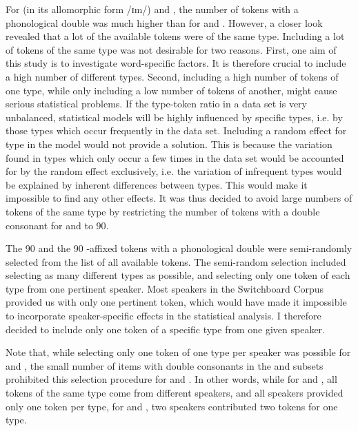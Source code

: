 For  (in its allomorphic form /ɪm/) and , the number of tokens with a phonological double was much higher than for  and . However, a closer look revealed that a lot of the available tokens were of the same type. Including a lot of tokens of the same type was not desirable for two reasons. 
First, one aim of this study is to investigate word-specific factors. It is therefore crucial to include a high number of different types. 
Second, including a high number of tokens of one type, while only including a low number of tokens of another, might cause serious statistical problems. If the type-token ratio in a data set is very unbalanced, statistical models will be highly influenced by specific types, i.e. by those types which occur frequently in the data set. Including a random effect for type in the model would not provide a solution. This is because the variation found in types which only occur a few times in the data set would be accounted for by the random effect exclusively, i.e. the variation of infrequent types would be explained by inherent differences between types. This would make it impossible to find any other effects. 
It was thus decided to avoid large numbers of tokens of the same type by restricting the number of tokens with a double consonant for  and  to 90.  


The 90  and the 90 -affixed tokens with a phonological double were semi-randomly selected from the list of all available tokens.  
The semi-random selection included selecting as many different types as possible, and selecting only one token of each type from one pertinent speaker.
Most speakers in the Switchboard Corpus provided us with only one pertinent token, which would have made it impossible to incorporate speaker-specific effects in the statistical analysis. I therefore decided to include only one token of a specific type from one given speaker. 

Note that, while selecting only one token of one type per speaker was possible for  and , the small number of items with double consonants in the  and subsets prohibited this selection procedure for  and . 
In other words, while for  and , all tokens of the same type come from different speakers, and all speakers provided only one token per type, for  and , two speakers contributed two tokens for one type. 


